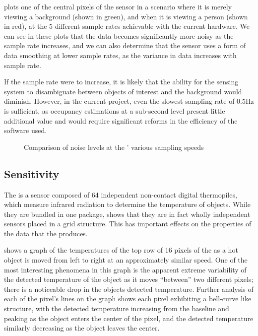 \documentclass[../thesis/thesis.tex]{subfiles}
\begin{document}
 plots one of the central pixels of the sensor in a scenario where it is merely viewing a background (shown in green), and when it is viewing a person (shown in red), at the 5 different sample rates achievable with the current hardware. We can see in these plots that the data becomes significantly more noisy as the sample rate increases, and we can also determine that the sensor uses a form of data smoothing at lower sample rates, as the variance in data increases with sample rate.

If the sample rate were to increase, it is likely that the ability for the sensing system to disambiguate between objects of interest and the background would diminish. However, in the current project, even the slowest sampling rate of 0.5Hz is sufficient, as occupancy estimations at a sub-second level present little additional value and would require significant reforms in the efficiency of the software used.


\begin{figure}
  \centering
  
\caption{Comparison of noise levels at the \mlx' various sampling speeds}
\label{fig:noise}
\end{figure}


\subsection{Sensitivity}

The \mlx is a sensor composed of 64 independent non-contact digital thermopiles, which measure infrared radiation to determine the temperature of objects. While they are bundled in one package,  shows that they are in fact wholly independent sensors placed in a grid structure. This has important effects on the properties of the data that the \mlx produces. 

 shows a graph of the temperatures of the top row of 16 pixels of the \mlx as a hot object is moved from left to right at an approximately similar speed. One of the most interesting phenomena in this graph is the apparent extreme variability of the detected temperature of the object as it moves ``between'' two different pixels; there is a noticeable drop in the objects detected temperature. Further analysis of each of the pixel's lines on the graph shows each pixel exhibiting a bell-curve like structure, with the detected temperature increasing from the baseline and peaking as the object enters the center of the pixel, and the detected temperature similarly decreasing as the object leaves the center. 
\end{document}
